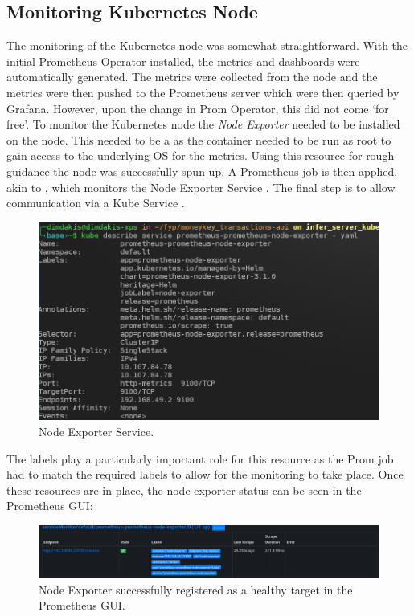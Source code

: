 \subsection{Monitoring Kubernetes Node}
The monitoring of the Kubernetes node was somewhat straightforward. With the initial Prometheus Operator installed, the metrics and
dashboards were automatically generated. The metrics were collected from the node and the metrics were then pushed to the Prometheus server which
were then queried by Grafana. However, upon the change in Prom Operator, this did not come `for free'.
\bigbreak
To monitor the Kubernetes node the \emph{Node Exporter}\autocite{NodeExporter2022} needed to be installed on the node. This needed to be a
 as the container needed to be run as root to gain access to the underlying OS for the metrics. Using this resource\autocite{HowSetupPrometheus2021} for
rough guidance the node was successfully spun up. A Prometheus job is then applied, akin to , which monitors the Node Exporter
Service . The final step is to allow communication via a Kube Service .
\begin{figure}[H]
	\centering
	\includegraphics[width=0.8\linewidth]{figures/node_exporter_service.png}
	\caption{Node Exporter Service.}
	\label{fig:node-exporter-service}
\end{figure}
The labels play a particularly important role for this resource as the Prom job had to match the required labels to allow for the monitoring to
take place. Once these resources are in place, the node exporter status can be seen in the Prometheus GUI:
\begin{figure}[H]
	\centering
	\includegraphics[width=1\linewidth]{figures/prom_node_exporter_target.png}
	\caption{Node Exporter successfully registered as a healthy target in the Prometheus GUI.}
	\label{fig:prom_node_exporter_target}
\end{figure}
